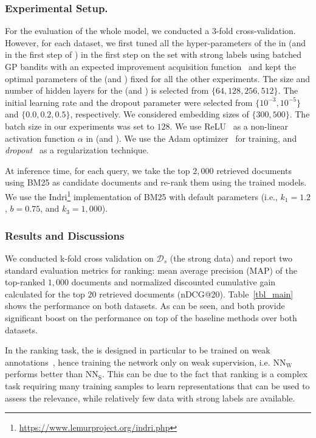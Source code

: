 \subsubsection{Experimental Setup.}
For the evaluation of the whole model, we conducted a 3-fold cross-validation. However, for each dataset, we first tuned all the hyper-parameters of the \tnet in \cws (and \std in the first step of \fwl) in the first step on the set with strong labels using batched GP bandits with an expected improvement acquisition function~\citep{Desautels:2014} and kept the optimal parameters of the \tnet (and \std) fixed for all the other experiments.
The size and number of hidden layers for the \tnet (and \std) is selected from $\{64, 128, 256, 512\}$. The initial learning rate and the dropout parameter were selected from $\{10^{-3}, 10^{-5}\}$ and $\{0.0, 0.2, 0.5\}$, respectively. We considered embedding sizes of $\{300, 500\}$. The batch size in our experiments was set to $128$.  We use ReLU~\citep{Nair:2010} as a non-linear activation function $\alpha$ in \tnet (and \std).  We use the Adam optimizer~\citep{Kingma:2014} for training, and \emph{dropout}~\citep{Srivastava:2014} as a regularization technique.

%
At inference time, for each query, we take the top $2,000$ retrieved documents using BM25 as candidate documents and re-rank them using the trained models. We use the Indri\footnote{\url{https://www.lemurproject.org/indri.php}} implementation of BM25 with default parameters (i.e., $k_1 = 1.2$, $b = 0.75$, and $k_3 = 1,000$).

\subsubsection{Results and Discussions} 
\label{sec:res_and_disc_ranking}
We conducted k-fold cross validation on $\mathcal{D}_s$ (the strong data) and report two standard evaluation metrics for ranking: mean average precision (MAP) of the top-ranked $1,000$
documents and normalized discounted cumulative gain calculated for the top $20$ retrieved documents (nDCG@20). 
Table~\ref{tbl_main} shows the performance on both datasets. As can be seen, \fwl and \cws both provide significant boost on the performance on top of the baseline methods over both datasets.




In the ranking task, the \std is designed in particular to be trained on weak annotations~\citep{Dehghani:2017:SIGIR}, hence training the network only on weak supervision, i.e. $\text{NN}_{\text{W}}$ performs better than $\text{NN}_{\text{S}}$. This can be due to the fact that ranking is a complex task requiring many training samples to learn representations that can be used to assess the relevance, while relatively few data with strong labels are available.

